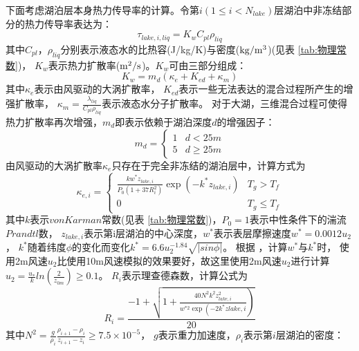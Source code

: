 下面考虑湖泊层本身热力传导率的计算。令第$i\left(1\le i<N_{lake}\right)$层湖泊中非冻结部分的热力传导率表达为：
\begin{equation}
\tau_{lake, i, liq}=K_{w} C_{p l} \rho_{liq}
\end{equation}
其中$C_{pl}$，$\rho_{liq}$分别表示液态水的比热容(J/kg/K)与密度($\rm kg/m^3$)(见表 \ref{tab:物理常数})，
$K_w$表示热力扩散率($\rm m^2/s$)。$K_w$可由三部分组成\citep{subin2012improved}：
\begin{equation}
K_{w}=m_{d}\left(\kappa_{e}+K_{e d}+\kappa_{m}\right)
\end{equation}
其中$\kappa_e$表示由风驱动的大涡扩散率\citep{hostetler1990simulation}，
$K_{ed}$表示一些无法表达的混合过程所产生的增强扩散率\citep{fang1996long}，
$\kappa_m=\frac{\lambda_{liq}}{C_{pl}\rho_{liq}}$表示液态水分子扩散率。
对于大湖，三维混合过程可使得热力扩散率再次增强，$m_d$即表示依赖于湖泊深度$d$的增强因子：
\begin{equation}
m_{d}=\left\{\begin{array}{ll}1 & d<25 m \\ 5 & d \geq 25 m\end{array}\right.
\end{equation}
由风驱动的大涡扩散率$\kappa_e$只存在于完全非冻结的湖泊层中，计算方式为
\begin{equation}
\kappa_{e, i}=\left\{\begin{array}{ll}\frac{k w^{*} z_{lake, i}}{P_{0}\left(1+37 R_{i}^{2}\right)} 
    \exp \left(-k^{*} z_{lake, i}\right) & T_{g}>T_{f} \\ 0 & T_{g} \leq T_{f}\end{array}\right.
\end{equation}
其中$k$表示$von Karman$常数(见表 \ref{tab:物理常数})，$P_0=1$表示中性条件下的湍流$Prandtl$数，
$z_{lake,i}$表示第i层湖泊的中心深度，$w^\ast$表示表层摩擦速度$w^\ast=0.0012u_2$，
$k^\ast$随着纬度$\phi$的变化而变化$k^\ast=6.6u_2^{-1.84}\sqrt{\left|sin\phi\right|}$。
根据 \citet{hostetler1990simulation}，计算$w^\ast$与$k^\ast$时，
使用2m风速$u_2$比使用10m风速模拟的效果要好，故这里使用2m风速$u_2$进行计算$u_2=\frac{u_\ast}{k}ln{\left(\frac{2}{z_{0m}}\right)}\geq0.1$。
$R_i$表示理查德森数，计算公式为
\begin{equation}
R_{i}=\frac{-1+\sqrt{\left.1+\frac{40 N^{2} k^{2} z_{lake, i}^{2}}{w^{* 2} \exp \left(-2 k^{*} z lake, i\right.}\right)}}{20}
\end{equation}
其中$N^2=\frac{g}{\rho_i}\frac{\rho_{i+1}-\rho_i}{z_{i+1}-z_i}\geq7.5\times{10}^{-5}$，
$g$表示重力加速度，$\rho_i$表示第$i$层湖泊的密度\citep{hostetler1990simulation}：
